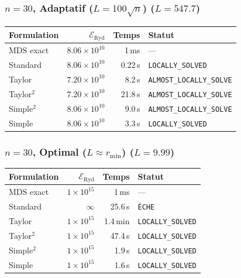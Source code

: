 \subsubsection{$n=30$, Adaptatif ($L{=}100\sqrt{n}$) ($L=547.7$)}
\begin{longtable}{@{}lrrl@{}}
  \toprule
  Formulation & $\mathcal{E}_{\mathrm{Ryd}}$ & Temps & Statut \\
  \midrule
  \endhead
  MDS exact & $8.06\times10^{10}$ & 1\,ms & --- \\
  Standard & $8.06\times10^{10}$ & 0.22\,s & \texttt{LOCALLY\_SOLVED} \\
  Taylor & $7.20\times10^{10}$ & 8.2\,s & \texttt{ALMOST\_LOCALLY\_SOLVE} \\
  Taylor$^2$ & $7.20\times10^{10}$ & 21.8\,s & \texttt{ALMOST\_LOCALLY\_SOLVE} \\
  Simple$^2$ & $8.06\times10^{10}$ & 9.0\,s & \texttt{ALMOST\_LOCALLY\_SOLVE} \\
  Simple & $8.06\times10^{10}$ & 3.3\,s & \texttt{LOCALLY\_SOLVED} \\
  \bottomrule
\end{longtable}

\subsubsection{$n=30$, Optimal ($L{\approx}r_{\min}$) ($L=9.99$)}
\begin{longtable}{@{}lrrl@{}}
  \toprule
  Formulation & $\mathcal{E}_{\mathrm{Ryd}}$ & Temps & Statut \\
  \midrule
  \endhead
  MDS exact & $1\times10^{15}$ & 1\,ms & --- \\
  Standard & $\infty$ & 25.6\,s & \texttt{ÉCHE} \\
  Taylor & $1\times10^{15}$ & 1.4\,min & \texttt{LOCALLY\_SOLVED} \\
  Taylor$^2$ & $1\times10^{15}$ & 47.4\,s & \texttt{LOCALLY\_SOLVED} \\
  Simple$^2$ & $1\times10^{15}$ & 1.9\,s & \texttt{LOCALLY\_SOLVED} \\
  Simple & $1\times10^{15}$ & 1.6\,s & \texttt{LOCALLY\_SOLVED} \\
  \bottomrule
\end{longtable}


